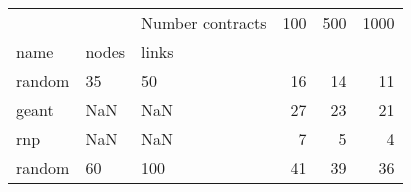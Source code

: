 \begin{tabular}{lllrrr}
\toprule
 &  & Number contracts & 100 & 500 & 1000 \\
name & nodes & links &  &  &  \\
\midrule
random & 35 & 50 & 16 & 14 & 11 \\
\cline{1-6} \cline{2-6}
geant & NaN & NaN & 27 & 23 & 21 \\
\cline{1-6} \cline{2-6}
rnp & NaN & NaN & 7 & 5 & 4 \\
\cline{1-6} \cline{2-6}
random & 60 & 100 & 41 & 39 & 36 \\
\cline{1-6} \cline{2-6}
\bottomrule
\end{tabular}
